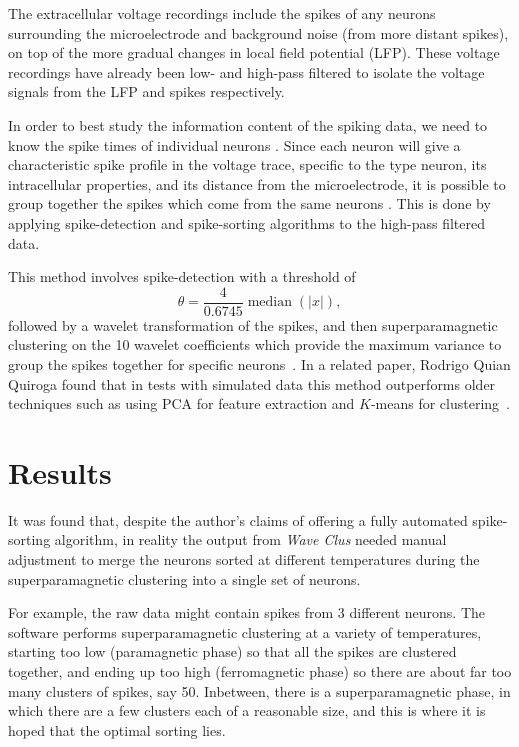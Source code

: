 The extracellular voltage recordings include the spikes of any neurons surrounding the microelectrode and background noise (from more distant spikes), on top of the more gradual changes in local field potential (LFP). These voltage recordings have already been low- and high-pass filtered to isolate the voltage signals from the LFP and spikes respectively.

In order to best study the information content of the spiking data, we need to know the spike times of individual neurons \cite{Quiroga2009}. Since each neuron will give a characteristic spike profile in the voltage trace, specific to the type neuron, its intracellular properties, and its distance from the microelectrode, it is possible to group together the spikes which come from the same neurons \cite{Quiroga2007}.
This is done by applying spike-detection and spike-sorting algorithms to the high-pass filtered data.

This method involves spike-detection with a threshold of
$$
\theta
= \frac{4}{0.6745} \operatorname{median} \left( |x| \right)
,$$
followed by a wavelet transformation of the spikes, and then superparamagnetic clustering on the 10 wavelet coefficients which provide the maximum variance to group the spikes together for specific neurons~\cite{Quiroga2004}.
In a related paper, Rodrigo Quian Quiroga \etal{} found that in tests with simulated data this method outperforms older techniques such as using PCA for feature extraction and $K$-means for clustering~\cite{Quiroga2004}.

\section{Results}
\label{sec:sorting-result}

It was found that, despite the author's claims of offering a fully automated spike-sorting algorithm, in reality the output from \textit{Wave Clus} needed manual adjustment to merge the neurons sorted at different temperatures during the superparamagnetic clustering into a single set of neurons.

For example, the raw data might contain spikes from 3 different neurons. The software performs superparamagnetic clustering at a variety of temperatures, starting too low (paramagnetic phase) so that all the spikes are clustered together, and ending up too high (ferromagnetic phase) so there are about far too many clusters of spikes, say 50. Inbetween, there is a superparamagnetic phase, in which there are a few clusters each of a reasonable size, and this is where it is hoped that the optimal sorting lies.

